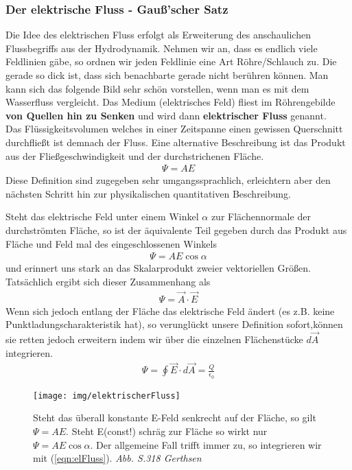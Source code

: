 \subsubsection{Der elektrische Fluss - Gauß'scher Satz}
\label{sec:elFluss}
Die Idee des elektrischen Fluss erfolgt als Erweiterung des anschaulichen Flussbegriffs aus der Hydrodynamik. Nehmen wir an, dass es endlich viele Feldlinien gäbe, so ordnen wir jeden Feldlinie eine Art Röhre/Schlauch zu. Die gerade so dick ist, dass sich benachbarte gerade nicht berühren können. Man kann sich das folgende Bild sehr schön vorstellen, wenn man es mit dem Wasserfluss vergleicht. Das Medium (elektrisches Feld)  fliest im Röhrengebilde  \textbf{von Quellen hin zu Senken} und wird dann \textbf{elektrischer Fluss} genannt.\\ Das Flüssigkeitsvolumen welches in einer Zeitspanne einen gewissen Querschnitt durchfließt ist demnach der Fluss. Eine alternative Beschreibung ist das Produkt aus der Fließgeschwindigkeit und der durchstrichenen Fläche.\begin{align}
\Psi = AE
\end{align}Diese Definition sind zugegeben sehr umgangssprachlich, erleichtern aber den nächsten Schritt hin zur physikalischen quantitativen Beschreibung. \par 
Steht das elektrische Feld unter einem Winkel $\alpha$ zur Flächennormale der durchströmten Fläche, so ist der äquivalente Teil gegeben durch das Produkt aus Fläche und Feld mal des eingeschlossenen Winkels\begin{align}
\Psi = AE\cos \alpha
\end{align}und erinnert uns stark an das Skalarprodukt zweier vektoriellen Größen. Tatsächlich ergibt sich dieser Zusammenhang als\begin{align}
\Psi = \vec{A} \cdot \vec{E}
\end{align} Wenn sich jedoch entlang der Fläche das elektrische Feld ändert (es z.B. keine Punktladungscharakteristik hat), so verunglückt unsere Definition sofort,können sie retten  jedoch erweitern indem wir über die einzelnen Flächenstücke $d\vec{A}$ integrieren.\begin{align}
\boxed{\Psi = \oint \vec{E} \cdot d\vec{A} = \frac{Q}{\epsilon_0}} \label{eqn:elFluss}
\end{align}

\begin{figure}
\begin{center}\texttt{[image: img/elektrischerFluss]}\end{center}
\caption{Steht das überall konstante E-Feld senkrecht auf der Fläche, so gilt \mbox{$\Psi = AE$}. Steht E(const!) schräg zur Fläche so wirkt nur $\Psi = AE\cos \alpha$. Der allgemeine Fall trifft immer zu, so integrieren wir mit (\ref{eqn:elFluss}). \textit{Abb. S.318 Gerthsen} }
\label{pic:elFluss}
\end{figure}
